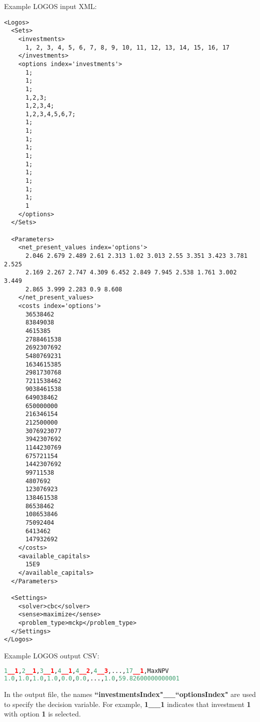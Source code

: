 Example LOGOS input XML:
\begin{lstlisting}[style=XML]
<Logos>
  <Sets>
    <investments>
      1, 2, 3, 4, 5, 6, 7, 8, 9, 10, 11, 12, 13, 14, 15, 16, 17
    </investments>
    <options index='investments'>
      1;
      1;
      1;
      1,2,3;
      1,2,3,4;
      1,2,3,4,5,6,7;
      1;
      1;
      1;
      1;
      1;
      1;
      1;
      1;
      1;
      1;
      1
    </options>
  </Sets>

  <Parameters>
    <net_present_values index='options'>
      2.046 2.679 2.489 2.61 2.313 1.02 3.013 2.55 3.351 3.423 3.781 2.525
      2.169 2.267 2.747 4.309 6.452 2.849 7.945 2.538 1.761 3.002 3.449
      2.865 3.999 2.283 0.9 8.608
    </net_present_values>
    <costs index='options'>
      36538462
      83849038
      4615385
      2788461538
      2692307692
      5480769231
      1634615385
      2981730768
      7211538462
      9038461538
      649038462
      650000000
      216346154
      212500000
      3076923077
      3942307692
      1144230769
      675721154
      1442307692
      99711538
      4807692
      123076923
      138461538
      86538462
      108653846
      75092404
      6413462
      147932692
    </costs>
    <available_capitals>
      15E9
    </available_capitals>
  </Parameters>

  <Settings>
    <solver>cbc</solver>
    <sense>maximize</sense>
    <problem_type>mckp</problem_type>
  </Settings>
</Logos>
\end{lstlisting}

Example LOGOS output CSV:
\begin{lstlisting}[language=python]
1__1,2__1,3__1,4__1,4__2,4__3,...,17__1,MaxNPV
1.0,1.0,1.0,1.0,0.0,0.0,...,1.0,59.82600000000001
\end{lstlisting}

In the output file, the names \textbf{``investmentsIndex"\_\_``optionsIndex"} are used to
specify the decision variable. For example, \textbf{1\_\_1} indicates that investment \textbf{1}
with option \textbf{1} is selected.
